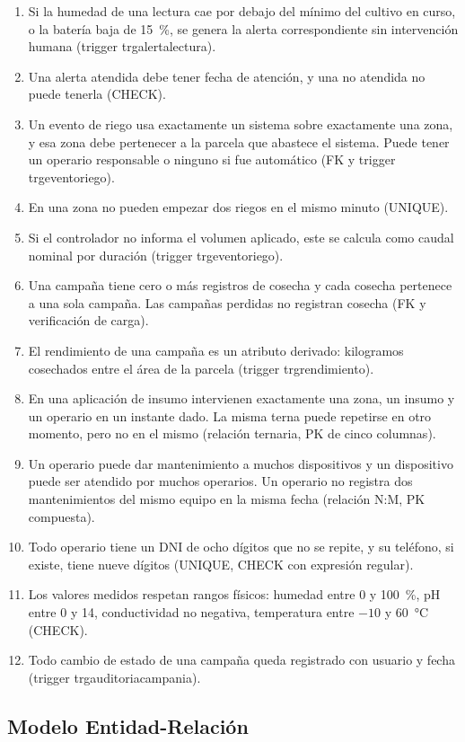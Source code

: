 \documentclass[11pt,letterpaper]{article}
\newcommand{\tbus}{\textunderscore\allowbreak}
\newcommand{\tb}[1]{{\ttfamily\let\_\tbus #1}}
\begin{document}
\begin{enumerate}[label=\textbf{R\arabic*.},leftmargin=2.3em,itemsep=0.15em]
\item Si la humedad de una lectura cae por debajo del mínimo del cultivo en curso, o la batería baja de 15~\%, se genera la alerta correspondiente sin intervención humana (trigger \tb{trg\_alerta\_lectura}).
\item Una alerta atendida debe tener fecha de atención, y una no atendida no puede tenerla (\tb{CHECK}).
\item Un evento de riego usa exactamente un sistema sobre exactamente una zona, y esa zona debe pertenecer a la parcela que abastece el sistema. Puede tener un operario responsable o ninguno si fue automático (FK y trigger \tb{trg\_evento\_riego}).
\item En una zona no pueden empezar dos riegos en el mismo minuto (\tb{UNIQUE}).
\item Si el controlador no informa el volumen aplicado, este se calcula como caudal nominal por duración (trigger \tb{trg\_evento\_riego}).
\item Una campaña tiene cero o más registros de cosecha y cada cosecha pertenece a una sola campaña. Las campañas perdidas no registran cosecha (FK y verificación de carga).
\item El rendimiento de una campaña es un atributo derivado: kilogramos cosechados entre el área de la parcela (trigger \tb{trg\_rendimiento}).
\item En una aplicación de insumo intervienen exactamente una zona, un insumo y un operario en un instante dado. La misma terna puede repetirse en otro momento, pero no en el mismo (relación ternaria, PK de cinco columnas).
\item Un operario puede dar mantenimiento a muchos dispositivos y un dispositivo puede ser atendido por muchos operarios. Un operario no registra dos mantenimientos del mismo equipo en la misma fecha (relación N:M, PK compuesta).
\item Todo operario tiene un DNI de ocho dígitos que no se repite, y su teléfono, si existe, tiene nueve dígitos (\tb{UNIQUE}, \tb{CHECK} con expresión regular).
\item Los valores medidos respetan rangos físicos: humedad entre 0 y 100~\%, pH entre 0 y 14, conductividad no negativa, temperatura entre $-10$ y 60~°C (\tb{CHECK}).
\item Todo cambio de estado de una campaña queda registrado con usuario y fecha (trigger \tb{trg\_auditoria\_campania}).
\end{enumerate}

\subsection{Modelo Entidad-Relación}
\end{document}
